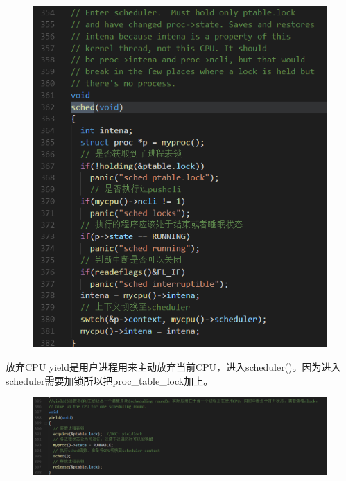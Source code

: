 \documentclass[a4paper,12pt]{report}
\begin{document}
\begin{figure}[H]
	\centering
	\includegraphics [width=1.0\textwidth]{figure//image106.png}
\end{figure}
放弃CPU
yield是用户进程用来主动放弃当前CPU，进入scheduler()。因为进入scheduler需要加锁所以把proc\_table\_lock加上。
\begin{figure}[H]
	\centering
	\includegraphics [width=1.0\textwidth]{figure//image107.png}
\end{figure}
\end{document}
